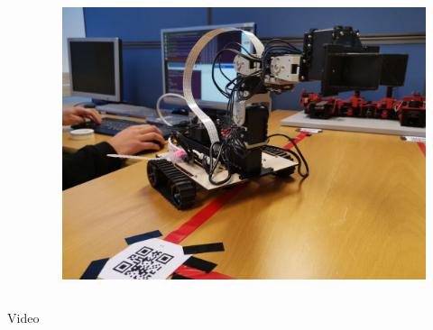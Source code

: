 \begin{frame}
\begin{columns}
\begin{column}[]{0.5\textwidth}
        \end{column}
        \begin{column}[]{0.5\textwidth}
            \begin{figure}
                \centering
                \includegraphics[width=\textwidth]{frames/img/view2.jpg}
            \end{figure}
        \end{column}
    \end{columns}
\end{frame}

\begin{frame}
    \centering
    \Huge Video
\end{frame}